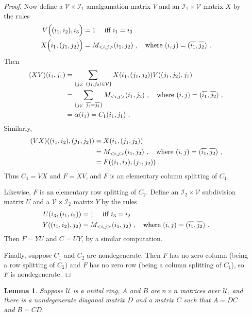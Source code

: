 \documentclass{amsart}
\newtheorem{lemma}[theorem]{Lemma}
\theoremstyle{definition}
\theoremstyle{remark}
\numberwithin{equation}{section}
\begin{document}
{\begin{proof}
Now define a $\mathcal V \times \mathcal I_1$
amalgamation matrix $V$ and an 
$\mathcal I_1\times \mathcal V$
matrix $X$ by the rules 
\begin{align*} 
V\Big((i_1,i_2),i_3\Big)& =1 \quad \ \textnormal{iff }i_1=i_3 \\ 
X\Big(i_1,(j_1,j_2)\Big)& = M_{<i,j>}(i_1,j_2) \ , \quad 
\textnormal{where }(i,j)=(\overline{i_1},\overline{j_2})\ .  
\end{align*} 
Then 
\begin{align*} 
(XV)(i_1,j_1) & = 
\sum_{\{j_2:\  (j_1,j_2)\in \mathcal V\}} 
X(i_1,(j_1,j_2))V((j_1,j_2),j_1) \\ 
&=\sum_{
\{j_2: \ \overline{j_1}=\overline{j_2}\}}
M_{<i,j>}(i_1,j_2) 
\ , \quad 
\textnormal{where }(i,j)=(\overline{i_1},
\overline{j_2})\ , 
\\ 
&= \alpha(i_1) = C_1(i_1,j_1) \ . 
\end{align*} 
Similarly, 
\begin{align*}  
(VX)((i_1,i_2),(j_1,j_2)) 
&= X(i_1,(j_1,j_2)) \\ 
&= M_{<i,j>}(i_1,j_2) \ , \quad 
\textnormal{where }(i,j)=(\overline{i_1},\overline{j_2})\ ,   \\ 
&=F((i_1,i_2),(j_1,j_2)) \ . 
\end{align*} 
Thus $C_1=VX$ and $F=XV$, and $F$ is an elementary 
column splitting of $C_1$. 

Likewise, $F$ is an elementary row splitting of $C_2$. Define an $\mathcal I_2 
\times \mathcal V$ subdivision matrix $U$ and a $\mathcal V \times \mathcal I_2$ 
matrix $Y$ by the rules 
\begin{align*}
U(i_3,(i_1,i_2))&= 1 \quad \textnormal{ iff } i_3=i_2 \\ 
Y((i_1,i_2),j_2) &= 
M_{<i,j>}(i_1,j_2) \ , \quad 
\textnormal{where }(i,j)=(\overline{i_1},\overline{j_2})\ . 
\end{align*}
Then $F=YU$ and $C=UY$, by a similar computation. 

Finally, suppose $C_1$ and $C_2$ are nondegenerate. 
Then $F$ has no zero column (being a row splitting of $C_2$) 
and $F$ has no zero row (being a column splitting of $C_1$), 
so $F$ is nondegenerate. 
\end{proof} 

\begin{lemma}\label{diagrefactoconj}
Suppose $\mathcal U $ is a unital ring, $A$ and $B$ are $n\times n$ 
matrices over $\mathcal U$, and there is a nondegenerate diagonal 
matrix $D$ and a matrix $C$ such that $A=DC$ and $B=CD$. 


\end{lemma}}
\end{document}
